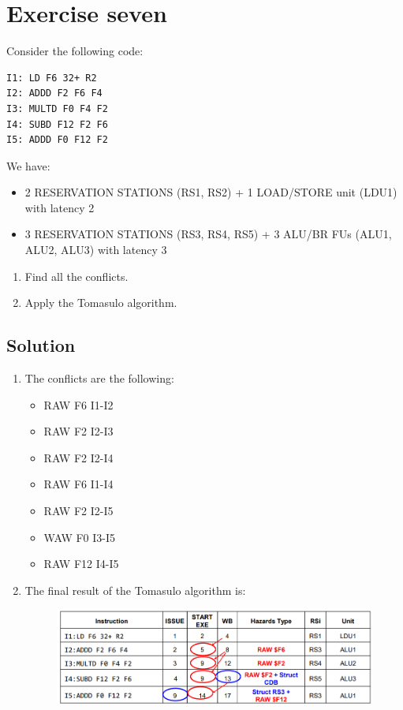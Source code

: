 \section{Exercise seven}

Consider the following code: 
\begin{verbatim}
I1: LD F6 32+ R2
I2: ADDD F2 F6 F4
I3: MULTD F0 F4 F2
I4: SUBD F12 F2 F6
I5: ADDD F0 F12 F2
\end{verbatim}
We have: 
\begin{itemize}
    \item 2 RESERVATION STATIONS (RS1, RS2) + 1 LOAD/STORE unit (LDU1) with latency 2
    \item 3 RESERVATION STATIONS (RS3, RS4, RS5) + 3 ALU/BR FUs (ALU1, ALU2, ALU3)    with latency 3
\end{itemize}
\begin{enumerate}
    \item Find all the conflicts. 
    \item Apply the Tomasulo algorithm. 
\end{enumerate}

\subsection*{Solution}
\begin{enumerate}
    \item The conflicts are the following: 
        \begin{itemize}
            \item RAW F6 I1-I2
            \item RAW F2 I2-I3
            \item RAW F2 I2-I4
            \item RAW F6 I1-I4
            \item RAW F2 I2-I5
            \item WAW F0 I3-I5
            \item RAW F12 I4-I5
        \end{itemize}
    \item The final result of the Tomasulo algorithm is: 
        \begin{figure}[H]
            \centering
            \includegraphics[width=1\linewidth]{images/tom.png}
        \end{figure}
\end{enumerate}